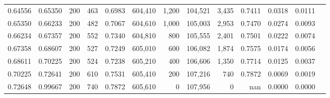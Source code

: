 \begin{tabular}{rrrrrrrrrrrrr}
0.64556 & 0.65350 &    200 & 463 &                                     0.6983 & 604,410 &   1,200 & 104,521 &   3,435 & 0.7411 & 0.0318 & 0.0111 \\
0.65350 & 0.66233 &    200 & 482 &                                     0.7067 & 604,610 &   1,000 & 105,003 &   2,953 & 0.7470 & 0.0274 & 0.0093 \\
0.66234 & 0.67357 &    200 & 552 &                                     0.7340 & 604,810 &     800 & 105,555 &   2,401 & 0.7501 & 0.0222 & 0.0074 \\
0.67358 & 0.68607 &    200 & 527 &                                     0.7249 & 605,010 &     600 & 106,082 &   1,874 & 0.7575 & 0.0174 & 0.0056 \\
0.68611 & 0.70225 &    200 & 524 &                                     0.7238 & 605,210 &     400 & 106,606 &   1,350 & 0.7714 & 0.0125 & 0.0037 \\
0.70225 & 0.72641 &    200 & 610 &                                     0.7531 & 605,410 &     200 & 107,216 &     740 & 0.7872 & 0.0069 & 0.0019 \\
0.72648 & 0.99667 &    200 & 740 &                                     0.7872 & 605,610 &       0 & 107,956 &       0 &    nan & 0.0000 & 0.0000 \\
\bottomrule
\end{tabular}
